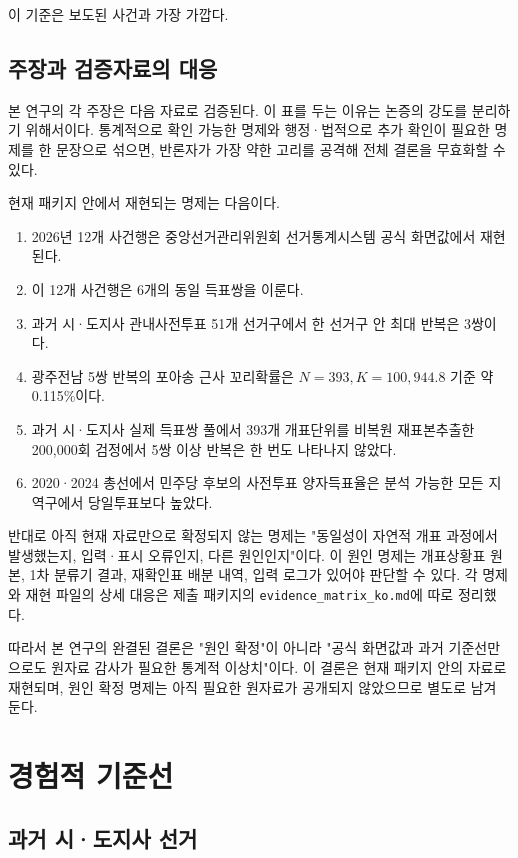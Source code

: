\documentclass[preprint]{IEIE}
\begin{document}
이 기준은 보도된 사건과 가장 가깝다.

\subsection{주장과 검증자료의 대응}

본 연구의 각 주장은 다음 자료로 검증된다. 이 표를 두는 이유는 논증의 강도를 분리하기 위해서이다. 통계적으로 확인 가능한 명제와 행정·법적으로 추가 확인이 필요한 명제를 한 문장으로 섞으면, 반론자가 가장 약한 고리를 공격해 전체 결론을 무효화할 수 있다.

현재 패키지 안에서 재현되는 명제는 다음이다.

\begin{enumerate}
\item 2026년 12개 사건행은 중앙선거관리위원회 선거통계시스템 공식 화면값에서 재현된다.
\item 이 12개 사건행은 6개의 동일 득표쌍을 이룬다.
\item 과거 시·도지사 관내사전투표 51개 선거구에서 한 선거구 안 최대 반복은 3쌍이다.
\item 광주전남 5쌍 반복의 포아송 근사 꼬리확률은 \(N=393, K=100,944.8\) 기준 약 0.115\%이다.
\item 과거 시·도지사 실제 득표쌍 풀에서 393개 개표단위를 비복원 재표본추출한 200,000회 검정에서 5쌍 이상 반복은 한 번도 나타나지 않았다.
\item 2020·2024 총선에서 민주당 후보의 사전투표 양자득표율은 분석 가능한 모든 지역구에서 당일투표보다 높았다.
\end{enumerate}

반대로 아직 현재 자료만으로 확정되지 않는 명제는 "동일성이 자연적 개표 과정에서 발생했는지, 입력·표시 오류인지, 다른 원인인지"이다. 이 원인 명제는 개표상황표 원본, 1차 분류기 결과, 재확인표 배분 내역, 입력 로그가 있어야 판단할 수 있다. 각 명제와 재현 파일의 상세 대응은 제출 패키지의 \texttt{evidence\_matrix\_ko.md}에 따로 정리했다.

따라서 본 연구의 완결된 결론은 "원인 확정"이 아니라 "공식 화면값과 과거 기준선만으로도 원자료 감사가 필요한 통계적 이상치"이다. 이 결론은 현재 패키지 안의 자료로 재현되며, 원인 확정 명제는 아직 필요한 원자료가 공개되지 않았으므로 별도로 남겨 둔다.

\section{경험적 기준선}

\subsection{과거 시·도지사 선거}
\end{document}
